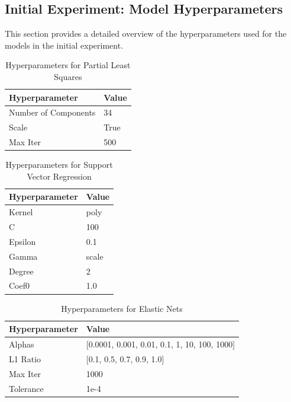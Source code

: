 \subsection{Initial Experiment: Model Hyperparameters}\label{subsec:initial_experiment_hyperparameters}
This section provides a detailed overview of the hyperparameters used for the models in the initial experiment.

\begin{table}[H]
\centering
\caption{Hyperparameters for Partial Least Squares}
\begin{tabular}{ll}
    \toprule
    \textbf{Hyperparameter} & \textbf{Value} \\
    \midrule
    Number of Components & 34 \\
    Scale & True \\
    Max Iter & 500 \\
    \bottomrule
\end{tabular}
\label{tab:pls_hyperparameters}
\end{table}
\FloatBarrier

\begin{table}[H]
\centering
\caption{Hyperparameters for Support Vector Regression}
\begin{tabular}{ll}
    \toprule
    \textbf{Hyperparameter} & \textbf{Value} \\
    \midrule
    Kernel & poly \\
    C & 100 \\
    Epsilon & 0.1 \\
    Gamma & scale \\
    Degree & 2 \\
    Coef0 & 1.0 \\
    \bottomrule
\end{tabular}
\label{tab:svr_hyperparameters}
\end{table}
\FloatBarrier

\begin{table}[H]
\centering
\caption{Hyperparameters for Elastic Nets}
\begin{tabular}{ll}
    \toprule
    \textbf{Hyperparameter} & \textbf{Value} \\
    \midrule
    Alphas & [0.0001, 0.001, 0.01, 0.1, 1, 10, 100, 1000] \\
    L1 Ratio & [0.1, 0.5, 0.7, 0.9, 1.0] \\
    Max Iter & 1000 \\
    Tolerance & 1e-4 \\
    \bottomrule
\end{tabular}
\label{tab:elasticnet_hyperparameters}
\end{table}
\FloatBarrier


